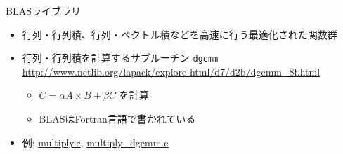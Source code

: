 \begin{frame}[t,fragile]{BLASライブラリ}
  \begin{itemize}
    \setlength{\itemsep}{1em}
  \item 行列・行列積、行列・ベクトル積などを高速に行う最適化された関数群
  \item 行列・行列積を計算するサブルーチン {\tt dgemm} \\
    \url{http://www.netlib.org/lapack/explore-html/d7/d2b/dgemm_8f.html}
    \begin{itemize}
    \item $C = \alpha A \times B + \beta C$ を計算
    \item BLASはFortran言語で書かれている
    \end{itemize}
  \item 例: \href{https://github.com/todo-group/computer-experiments/blob/master/exercise/matrix/multiply.c}{multiply.c}, \href{https://github.com/todo-group/computer-experiments/blob/master/exercise/matrix/multiply_dgemm.c}{multiply\_dgemm.c}
  \end{itemize}
\end{frame}
